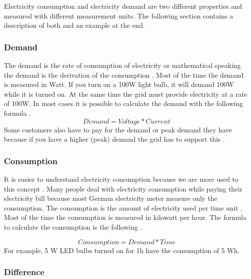 Electricity consumption and electricity demand are two different properties and measured with different measurement units.
The following section contains a description of both and an example at the end.

\subsubsection{Demand}

The demand is the rate of consumption of electricity or mathematical speaking the demand is the derivation of the consumption \cite{StonyBrookUniversity}.
Most of the time the demand is measured in Watt. If you turn on a 100W light bulb, it will demand 100W while it is turned on. At the same time the grid must provide electricity at a rate of 100W. In most cases it is possible to calculate the demand with the following formula \cite{nbpower}.
\begin{equation*}
	Demand = Voltage * Current
\end{equation*}
Some customers also have to pay for the demand or peak demand they have because if you have a higher (peak) demand the grid has to support this \cite{StonyBrookUniversity,enertiv}.  %


\subsubsection{Consumption}

It is easier to understand electricity consumption because we are more used to this concept \cite{StonyBrookUniversity}. Many people deal with electricity consumption while paying their electricity bill because most German electricity meter measure only the consumption. %
The consumption is the amount of electricity used per time unit \cite{StonyBrookUniversity}\cite{enertiv}. Most of the time the consumption is measured in kilowatt per hour.
The formula to calculate the consumption is the following \cite{StonyBrookUniversity}. %

\begin{equation*}
	Consumption = Demand * Time
\end{equation*}
For example, 5 W LED bulbs turned on for 1h have the consumption of 5 Wh.

\subsubsection{Difference}

